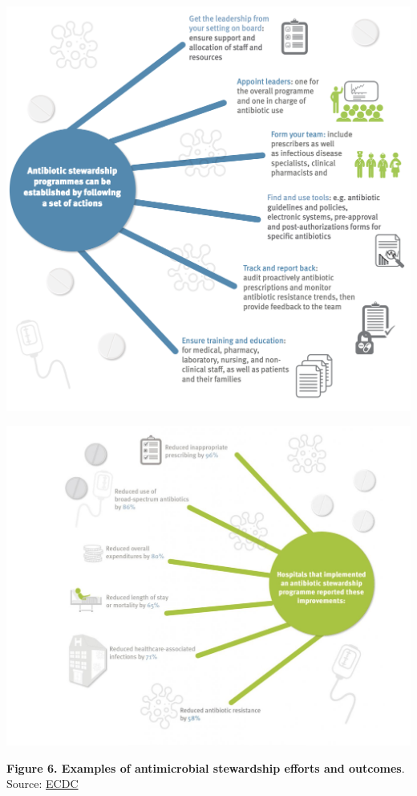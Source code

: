 \documentclass[
]{book}
\begin{document}
\includegraphics[width=6.25in,height=\textheight]{images/stewardship actions.png}

\includegraphics[width=6.25in,height=\textheight]{images/stewardship_impl.png}

\textbf{Figure 6. Examples of antimicrobial stewardship efforts and outcomes}. Source: \href{https://antibiotic.ecdc.europa.eu/en/infographics-about-antibiotic-stewardship-programmes}{ECDC}
\end{document}
